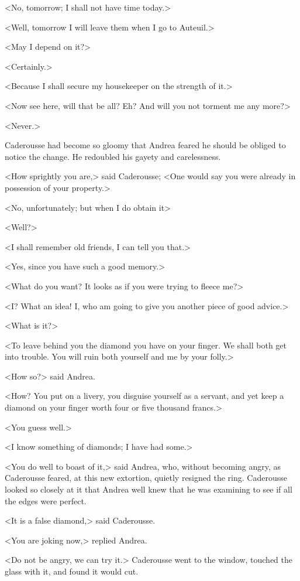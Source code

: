  <No, tomorrow; I shall not have time today.> 

 <Well, tomorrow I will leave them when I go to Auteuil.> 

 <May I depend on it?> 

 <Certainly.> 

 <Because I shall secure my housekeeper on the strength of it.> 

 <Now see here, will that be all? Eh? And will you not torment me any more?> 

 <Never.> 

 Caderousse had become so gloomy that Andrea feared he should be obliged to notice the change. He redoubled his gayety and carelessness. 

 <How sprightly you are,> said Caderousse; <One would say you were already in possession of your property.> 

 <No, unfortunately; but when I do obtain it\longdash> 

 <Well?> 

 <I shall remember old friends, I can tell you that.> 

 <Yes, since you have such a good memory.> 

 <What do you want? It looks as if you were trying to fleece me?> 

 <I? What an idea! I, who am going to give you another piece of good advice.> 

 <What is it?> 

 <To leave behind you the diamond you have on your finger. We shall both get into trouble. You will ruin both yourself and me by your folly.> 

 <How so?> said Andrea. 

 <How? You put on a livery, you disguise yourself as a servant, and yet keep a diamond on your finger worth four or five thousand francs.> 

 <You guess well.> 

 <I know something of diamonds; I have had some.> 

 <You do well to boast of it,> said Andrea, who, without becoming angry, as Caderousse feared, at this new extortion, quietly resigned the ring. Caderousse looked so closely at it that Andrea well knew that he was examining to see if all the edges were perfect. 

 <It is a false diamond,> said Caderousse. 

 <You are joking now,> replied Andrea. 

 <Do not be angry, we can try it.> Caderousse went to the window, touched the glass with it, and found it would cut. 


